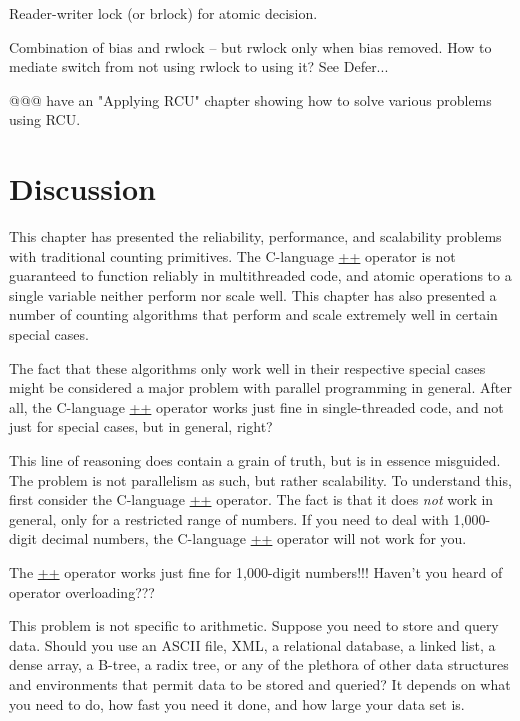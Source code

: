 Reader-writer lock (or brlock) for atomic decision.

Combination of bias and rwlock -- but rwlock only when bias removed.
How to mediate switch from not using rwlock to using it?  See Defer...

@@@ have an "Applying RCU" chapter showing how to solve various problems
using RCU.

\section{Discussion}
\label{sec:count:Discussion}

This chapter has presented the reliability, performance, and
scalability problems with traditional counting primitives.
The C-language \url{++} operator is not guaranteed to function reliably in
multithreaded code, and atomic operations to a single variable neither
perform nor scale well.
This chapter has also presented a number of counting algorithms that
perform and scale extremely well in certain special cases.

The fact that these algorithms only work well in their respective special
cases might be considered a major problem with parallel programming in
general.
After all, the C-language \url{++} operator works just fine in single-threaded
code, and not just for special cases, but in general, right?

This line of reasoning does contain a grain of truth, but is in essence
misguided.
The problem is not parallelism as such, but rather scalability.
To understand this, first consider the C-language \url{++} operator.
The fact is that it does \emph{not} work in general, only for a restricted
range of numbers.
If you need to deal with 1,000-digit decimal numbers, the C-language \url{++}
operator will not work for you.

\QuickQuiz{}
	The \url{++} operator works just fine for 1,000-digit numbers!!!
	Haven't you heard of operator overloading???
 \QuickQuizEnd

This problem is not specific to arithmetic.
Suppose you need to store and query data.
Should you use an ASCII file, XML, a relational database, a linked list,
a dense array, a B-tree, a radix tree, or any of the plethora of other data
structures and environments that permit data to be stored and queried?
It depends on what you need to do, how fast you need it done, and how
large your data set is.

